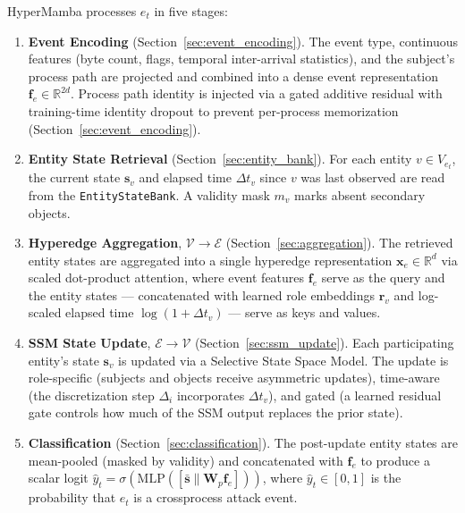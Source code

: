\documentclass[letterpaper,twocolumn,10pt]{article}
\begin{document}
HyperMamba processes $e_t$ in five stages:

\begin{enumerate}
    \item \textbf{Event Encoding} (Section~\ref{sec:event_encoding}). The event type, continuous features (byte count, flags, temporal inter-arrival statistics), and the subject's process path are projected and combined into a dense event representation $\mathbf{f}_{e} \in \mathbb{R}^{2d}$. Process path identity is injected via a gated additive residual with training-time identity dropout to prevent per-process memorization (Section~\ref{sec:event_encoding}).
    
    \item \textbf{Entity State Retrieval} (Section~\ref{sec:entity_bank}). For each entity $v \in V_{e_t}$, the current state $\mathbf{s}_v$ and elapsed time $\Delta t_v$ since $v$ was last observed are read from the \texttt{EntityStateBank}. A validity mask $m_v$ marks absent secondary objects.
    
    \item \textbf{Hyperedge Aggregation}, $\mathcal{V} \to \mathcal{E}$ (Section~\ref{sec:aggregation}). The retrieved entity states are aggregated into a single hyperedge representation $\mathbf{x}_e \in \mathbb{R}^d$ via scaled dot-product attention, where event features $\mathbf{f}_e$ serve as the query and the entity states --- concatenated with learned role embeddings $\mathbf{r}_v$ and log-scaled elapsed time $\log(1 + \Delta t_v)$ --- serve as keys and values.
    
    \item \textbf{SSM State Update}, $\mathcal{E} \to \mathcal{V}$ (Section~\ref{sec:ssm_update}). Each participating entity's state $\mathbf{s}_v$ is updated via a Selective State Space Model. The update is role-specific (subjects and objects receive asymmetric updates), time-aware (the discretization step $\Delta_i$ incorporates $\Delta t_v$), and gated (a learned residual gate controls how much of the SSM output replaces the prior state).
    
    \item \textbf{Classification} (Section~\ref{sec:classification}). The post-update entity states are mean-pooled (masked by validity) and concatenated with $\mathbf{f}_e$ to produce a scalar logit $\hat{y}_t = \sigma(\text{MLP}([\bar{\mathbf{s}} \parallel \mathbf{W}_p \mathbf{f}_e]))$, where $\hat{y}_t \in [0, 1]$ is the probability that $e_t$ is a crossprocess attack event.
\end{enumerate}
\end{document}
